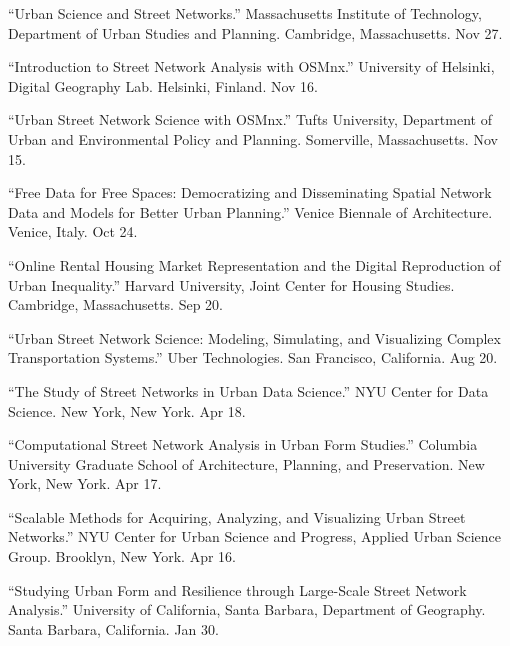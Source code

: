 \documentclass[11pt,a4paper]{report} %
\begin{document}
\begin{tablist}
\item[2018] \tab{}\enquote{Urban Science and Street Networks.} Massachusetts Institute of Technology, Department of Urban Studies and Planning. Cambridge, Massachusetts. Nov 27.

\item[2018] \tab{}\enquote{Introduction to Street Network Analysis with OSMnx.} University of Helsinki, Digital Geography Lab. Helsinki, Finland. Nov 16.

\item[2018] \tab{}\enquote{Urban Street Network Science with OSMnx.} Tufts University, Department of Urban and Environmental Policy and Planning. Somerville, Massachusetts. Nov 15.

\item[2018] \tab{}\enquote{Free Data for Free Spaces: Democratizing and Disseminating Spatial Network Data and Models for Better Urban Planning.} Venice Biennale of Architecture. Venice, Italy. Oct 24.

\item[2018] \tab{}\enquote{Online Rental Housing Market Representation and the Digital Reproduction of Urban Inequality.} Harvard University, Joint Center for Housing Studies. Cambridge, Massachusetts. Sep 20.

\item[2018] \tab{}\enquote{Urban Street Network Science: Modeling, Simulating, and Visualizing Complex Transportation Systems.} Uber Technologies. San Francisco, California. Aug 20.

\item[2018] \tab{}\enquote{The Study of Street Networks in Urban Data Science.} NYU Center for Data Science. New York, New York. Apr 18.

\item[2018] \tab{}\enquote{Computational Street Network Analysis in Urban Form Studies.} Columbia University Graduate School of Architecture, Planning, and Preservation. New York, New York. Apr 17.

\item[2018] \tab{}\enquote{Scalable Methods for Acquiring, Analyzing, and Visualizing Urban Street Networks.} NYU Center for Urban Science and Progress, Applied Urban Science Group. Brooklyn, New York. Apr 16.

\item[2018] \tab{}\enquote{Studying Urban Form and Resilience through Large-Scale Street Network Analysis.} University of California, Santa Barbara, Department of Geography. Santa Barbara, California. Jan 30.


\end{tablist}
\end{document}
